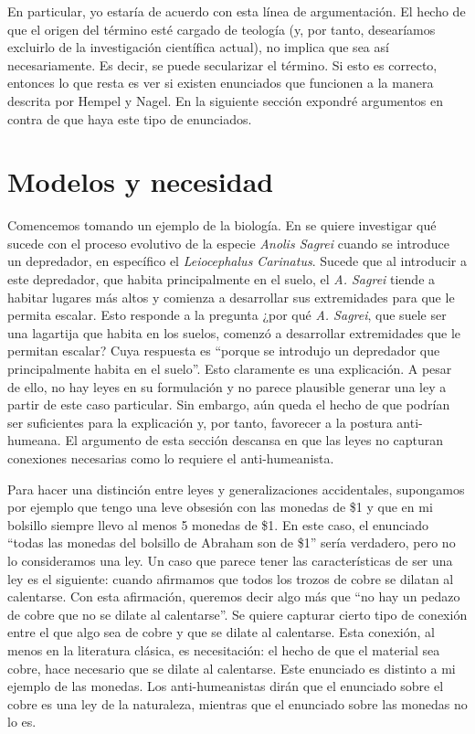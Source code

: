 En particular, yo estaría de acuerdo con esta línea de argumentación. El hecho de que el origen del término esté cargado de teología (y, por tanto, desearíamos excluirlo de la investigación científica actual), no implica que sea así necesariamente. Es decir, se puede secularizar el término. Si esto es correcto, entonces lo que resta es ver si existen enunciados que funcionen a la manera descrita por Hempel y Nagel. En la siguiente sección expondré argumentos en contra de que haya este tipo de enunciados.

\section{Modelos y necesidad}

\noindent Comencemos tomando un ejemplo de la biología. En \cite{Losos2004} se quiere investigar qué sucede con el proceso evolutivo de la especie \textit{Anolis Sagrei} cuando se introduce un depredador, en específico el \textit{Leiocephalus Carinatus}. Sucede que al introducir a este depredador, que habita principalmente en el suelo, el \textit{A. Sagrei} tiende a habitar lugares más altos y comienza a desarrollar sus extremidades para que le permita escalar. Esto responde a la pregunta ¿por qué \textit{A. Sagrei}, que suele ser una lagartija que habita en los suelos, comenzó a desarrollar extremidades que le permitan escalar? Cuya respuesta es ``porque se introdujo un depredador que principalmente habita en el suelo''. Esto claramente es una explicación. A pesar de ello, no hay leyes en su formulación y no parece plausible generar una ley a partir de este caso particular. Sin embargo, aún queda el hecho de que podrían ser suficientes para la explicación y, por tanto, favorecer a la postura anti-humeana. El argumento de esta sección descansa en que las leyes no capturan conexiones necesarias como lo requiere el anti-humeanista.

Para hacer una distinción entre leyes y generalizaciones accidentales, supongamos por ejemplo que tengo una leve obsesión con las monedas de \$1 y que en mi bolsillo siempre llevo al menos 5 monedas de \$1. En este caso, el enunciado ``todas las monedas del bolsillo de Abraham son de \$1'' sería verdadero, pero no lo consideramos una ley. Un caso que parece tener las características de ser una ley es el siguiente: cuando afirmamos que todos los trozos de cobre se dilatan al calentarse.  Con esta afirmación, queremos decir algo más que ``no hay un pedazo de cobre que no se dilate al calentarse''. Se quiere capturar cierto tipo de conexión entre el que algo sea de cobre y que se dilate al calentarse. Esta conexión, al menos en la literatura clásica, es necesitación: el hecho de que el material sea cobre, hace necesario que se dilate al calentarse. Este enunciado es distinto a mi ejemplo de las monedas. Los anti-humeanistas dirán que el enunciado sobre el cobre es una ley de la naturaleza, mientras que el enunciado sobre las monedas no lo es.

